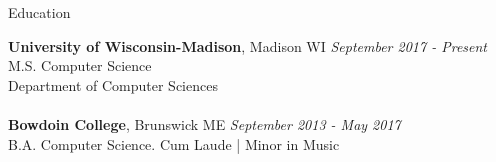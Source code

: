 \documentclass{resume} %
\begin{document}

\begin{rSection}{Education}

{\bf University of Wisconsin-Madison}, Madison WI \hfill {\em September 2017 - Present} 
\\ M.S. Computer Science
\\ Department of Computer Sciences\\

\\{\bf Bowdoin College}, Brunswick ME \hfill {\em September 2013 - May 2017} 
\\ B.A. Computer Science.\hfill { Cum Laude | }
Minor in Music \smallskip \\


\end{rSection}

\end{document}
